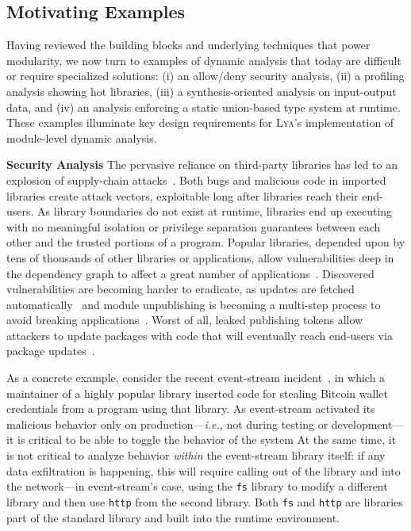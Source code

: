 \documentclass[letterpaper,twocolumn,10pt]{article}
\def\ie{{\em i.e.}, }
\newcommand{\heading}[1]{\vspace{2pt}\noindent\textbf{#1}\enspace}
\newcommand{\ttt}[1]{\texttt{#1}}
\newcommand{\sys}{{\scshape Lya}\xspace}
\begin{document}
\subsection{Motivating Examples}

Having reviewed the building blocks and underlying techniques that power modularity, we now turn to examples of dynamic analysis that today are difficult or require specialized solutions:
  (i) an allow/deny security analysis,
  (ii) a profiling analysis showing hot libraries,
  (iii) a synthesis-oriented analysis on input-output data, and
  (iv) an analysis enforcing a static union-based type system at runtime.
These examples illuminate key design requirements for \sys's implementation of module-level dynamic analysis.

\heading{Security Analysis}
The pervasive reliance on third-party libraries has led to an explosion of supply-chain attacks~\cite{long2015owasp, maass2016theory, snyk, lauinger2017thou}.
Both bugs and malicious code in imported libraries create attack vectors, exploitable long after libraries reach their end-users.
As library boundaries do not exist at runtime, libraries end up executing with no meaningful isolation or privilege separation guarantees between each other and the trusted portions of a program.
Popular libraries, depended upon by tens of thousands of other libraries or applications, allow vulnerabilities deep in the dependency graph to affect a great number of applications~\cite{leftpad, npmstudy:19}.
Discovered vulnerabilities are becoming harder to eradicate, as updates are fetched automatically~\cite{npmFailure} and module unpublishing is becoming a multi-step process to avoid breaking applications~\cite{npmUnpublish}.
Worst of all, leaked publishing tokens allow attackers to update packages with code that will eventually reach end-users via package updates~\cite{eslint1}.

As a concrete example, consider the recent event-stream incident~\cite{es1, es2}, in which a maintainer of a highly popular library inserted code for stealing Bitcoin wallet credentials from a program using that library.
As event-stream activated its malicious behavior only on production---\ie not during testing or development---it is critical to be able to toggle the behavior of the system
At the same time, it is not critical to analyze behavior \emph{within} the event-stream library itself:
  if any data exfiltration is happening, this will require calling out of the library and into the network---in event-stream's case, using the \ttt{fs} library to modify a different library and then use \ttt{http} from the second library.
Both \ttt{fs} and \ttt{http} are libraries part of the standard library and built into the runtime environment.
\end{document}
